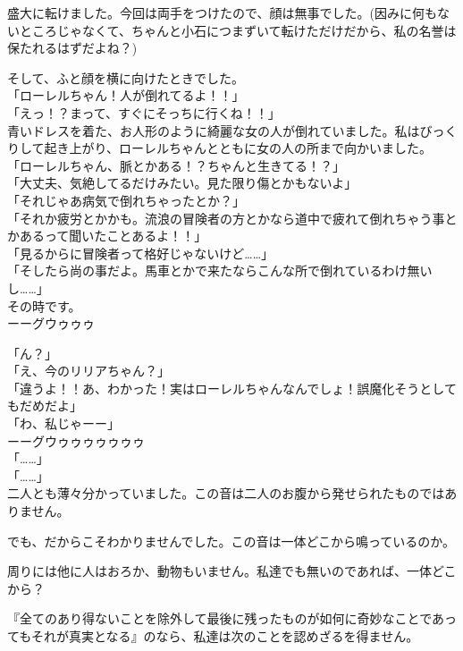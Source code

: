 \documentclass[oneside, a4paper]{jsbook}
\begin{document}
盛大に転けました。今回は両手をつけたので、顔は無事でした。(因みに何もないところじゃなくて、ちゃんと小石につまずいて転けただけだから、私の名誉は保たれるはずだよね？)

そして、ふと顔を横に向けたときでした。\\

\noindent
「ローレルちゃん！人が倒れてるよ！！」\\
「えっ！？まって、すぐにそっちに行くね！！」\\

青いドレスを着た、お人形のように綺麗な女の人が倒れていました。私はびっくりして起き上がり、ローレルちゃんとともに女の人の所まで向かいました。\\

\noindent
「ローレルちゃん、脈とかある！？ちゃんと生きてる！？」\\
「大丈夫、気絶してるだけみたい。見た限り傷とかもないよ」\\
「それじゃあ病気で倒れちゃったとか？」\\
「それか疲労とかかも。流浪の冒険者の方とかなら道中で疲れて倒れちゃう事とかあるって聞いたことあるよ！！」\\
「見るからに冒険者って格好じゃないけど……」\\
「そしたら尚の事だよ。馬車とかで来たならこんな所で倒れているわけ無いし……」\\

その時です。\\

ーーグウゥゥゥ

\noindent
「ん？」\\
「え、今のリリアちゃん？」\\
「違うよ！！あ、わかった！実はローレルちゃんなんでしょ！誤魔化そうとしてもだめだよ」\\
「わ、私じゃーー」\\

ーーグウゥゥゥゥゥゥゥ\\

\noindent
「……」\\
「……」\\

二人とも薄々分かっていました。この音は二人のお腹から発せられたものではありません。

でも、だからこそわかりませんでした。この音は一体どこから鳴っているのか。

周りには他に人はおろか、動物もいません。私達でも無いのであれば、一体どこから？

『全てのあり得ないことを除外して最後に残ったものが如何に奇妙なことであってもそれが真実となる』のなら、私達は次のことを認めざるを得ません。\\
\end{document}
